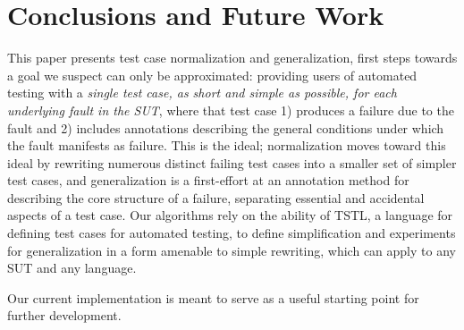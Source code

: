 \section{Conclusions and Future Work}

This paper presents test case normalization and generalization, first
steps towards a goal we suspect can only be approximated: providing
users of automated testing with a \emph{single test case, as short and
  simple as possible, for each underlying fault in the SUT}, where
that test case 1) produces a failure due to the fault and 2) includes
annotations describing the general conditions under which the fault
manifests as failure.  This is the ideal; normalization moves toward
this ideal by rewriting numerous distinct failing test cases into a
smaller set of simpler test cases, and generalization is a
first-effort at an annotation method for describing the core structure
of a failure, separating essential and accidental aspects of a test
case.  Our algorithms rely on the ability of TSTL, a language for
defining test cases for automated testing, to define simplification
and experiments for generalization in a form amenable to simple
rewriting, which can apply to any SUT and any language.

Our current implementation is meant to serve as a useful starting
point for further development.
